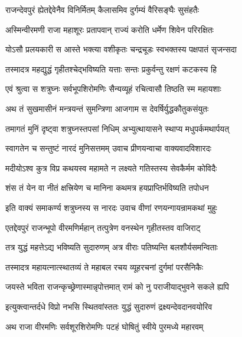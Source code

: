 
\twolineshloka
{राजन्देवपुरं ह्येतद्देवेनैव विनिर्मितम्}
{कैलासमिव दुर्गम्यं वैरिसङ्घैः सुसंहतैः}%

\twolineshloka
{अस्मिन्वीरमणी राजा महाशूरः प्रतापवान्}
{राज्यं करोति धर्मेण शिवेन परिरक्षितः}%

\twolineshloka
{योऽसौ प्रलयकारी स आस्ते भक्त्या वशीकृतः}
{चन्द्रचूडः स्वभक्तस्य पक्षपातं सृजन्सदा}%

\twolineshloka
{तस्मादत्र महद्युद्धं गृहीतश्चेद्भविष्यति}
{यत्ताः सन्तः प्रकुर्वन्तु रक्षणं कटकस्य हि}%

\twolineshloka
{एवं श्रुत्वा स शत्रुघ्नः सर्वभूपशिरोमणिः}
{सैन्यव्यूहं रचित्वासौ तिष्ठति स्म महायशाः}%

\twolineshloka
{अथ तं सुखमासीनं मन्त्रयन्तं सुमन्त्रिणा}
{आजगाम स देवर्षिर्युद्धकौतुकसंयुतः}%

\twolineshloka
{तमागतं मुनिं दृष्ट्वा शत्रुघ्नस्तपसां निधिम्}
{अभ्युत्थायासने स्थाप्य मधुपर्कमथार्पयत्}%

\twolineshloka
{स्वागतेन च सन्तुष्टं नारदं मुनिसत्तमम्}
{उवाच प्रीणयन्वाचा वाक्यवादविशारदः}%


\twolineshloka
{मदीयोऽश्व कुत्र विप्र कथयस्व महामते}
{न लक्ष्यते गतिस्तस्य सेवकैर्मम कोविदैः}%

\twolineshloka
{शंस तं येन वा नीतं क्षत्त्रियेण च मानिना}
{कथमत्र हयप्राप्तिर्भविष्यति तपोधन}%

\twolineshloka
{इति वाक्यं समाकर्ण्य शत्रुघ्नस्य स नारदः}
{उवाच वीणां रणयन्गायन्रामकथां मुहुः}%


\twolineshloka
{एतद्देवपुरं राजन्भूपो वीरमणिर्महान्}
{तत्पुत्रेण वनस्थेन गृहीतस्तव वाजिराट्}%

\twolineshloka
{तत्र युद्धं महत्तेऽद्य भविष्यति सुदारुणम्}
{अत्र वीराः पतिष्यन्ति बलशौर्यसमन्विताः}%

\twolineshloka
{तस्मादत्र महायत्नात्स्थातव्यं ते महाबल}
{रचय व्यूहरचनां दुर्गमां परसैनिकैः}%

\twolineshloka
{जयस्ते भविता राजन्कृच्छ्रेणास्मान्नृपोत्तमात्}
{रामं को नु पराजीयाद्भुवने सकले ह्यपि}%

\twolineshloka
{इत्युक्त्वान्तर्दधे विप्रो नभसि स्थितवांस्ततः}
{युद्धं सुदारुणं द्रक्ष्यन्देवदानवयोरिव}%


\twolineshloka
{अथ राजा वीरमणिः सर्वशूरशिरोमणिः}
{पटहं घोषितुं स्वीये पुरमध्ये महारवम्}%

